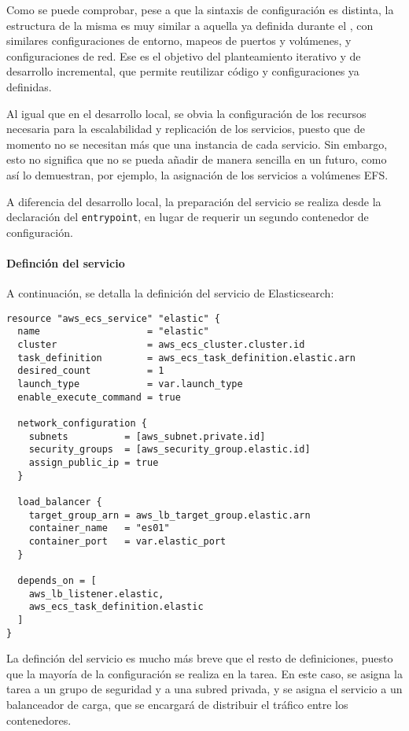 Como se puede comprobar, pese a que la sintaxis de configuración es distinta,
la estructura de la misma es muy similar a aquella ya definida durante el
, con similares configuraciones de entorno, mapeos de
puertos y volúmenes, y configuraciones de red. Ese es el objetivo del
planteamiento iterativo y de desarrollo incremental, que permite reutilizar
código y configuraciones ya definidas.

Al igual que en el desarrollo local, se obvia la configuración de los recursos
necesaria para la escalabilidad y replicación de los servicios, puesto que de
momento no se necesitan más que una instancia de cada servicio. Sin embargo,
esto no significa que no se pueda añadir de manera sencilla en un futuro, como
así lo demuestran, por ejemplo, la asignación de los servicios a volúmenes EFS.

A diferencia del desarrollo local, la preparación del servicio se realiza desde
la declaración del \texttt{entrypoint}, en lugar de requerir un segundo
contenedor de configuración.


\newpage{}
\paragraph{Definción del servicio}
A continuación, se detalla la definición del servicio de Elasticsearch:

\begin{lstlisting}[caption={Definción del servicio de Elastic}, label={lst:elastic_service}]
	resource "aws_ecs_service" "elastic" {
  name                   = "elastic"
  cluster                = aws_ecs_cluster.cluster.id
  task_definition        = aws_ecs_task_definition.elastic.arn
  desired_count          = 1
  launch_type            = var.launch_type
  enable_execute_command = true

  network_configuration {
    subnets          = [aws_subnet.private.id]
    security_groups  = [aws_security_group.elastic.id]
    assign_public_ip = true
  }

  load_balancer {
    target_group_arn = aws_lb_target_group.elastic.arn
    container_name   = "es01"
    container_port   = var.elastic_port
  }

  depends_on = [
    aws_lb_listener.elastic,
    aws_ecs_task_definition.elastic
  ]
}
\end{lstlisting}

La definción del servicio es mucho más breve que el resto de definiciones,
puesto que la mayoría de la configuración se realiza en la tarea. En este caso,
se asigna la tarea a un grupo de seguridad y a una subred privada, y se asigna
el servicio a un balanceador de carga, que se encargará de distribuir el tráfico
entre los contenedores.


